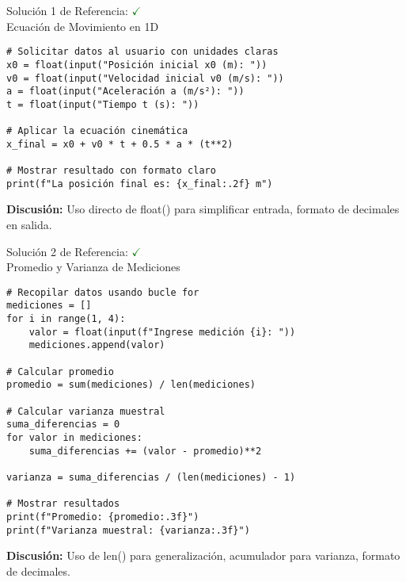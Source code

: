 \documentclass[10pt]{beamer}
\begin{document}
\begin{frame}[fragile]{Solución 1 de Referencia: \hfill \textcolor{green}{$\checkmark$} \\ Ecuación de Movimiento en 1D}
\begin{verbatim}
# Solicitar datos al usuario con unidades claras
x0 = float(input("Posición inicial x0 (m): "))
v0 = float(input("Velocidad inicial v0 (m/s): "))
a = float(input("Aceleración a (m/s²): "))
t = float(input("Tiempo t (s): "))

# Aplicar la ecuación cinemática
x_final = x0 + v0 * t + 0.5 * a * (t**2)

# Mostrar resultado con formato claro
print(f"La posición final es: {x_final:.2f} m")
\end{verbatim}
\textbf{Discusión:} Uso directo de float() para simplificar entrada, formato de decimales en salida.
\end{frame}

\begin{frame}[fragile]{Solución 2 de Referencia: \hfill \textcolor{green}{$\checkmark$} \\ Promedio y Varianza de Mediciones}
\begin{verbatim}
# Recopilar datos usando bucle for
mediciones = []
for i in range(1, 4):
    valor = float(input(f"Ingrese medición {i}: "))
    mediciones.append(valor)

# Calcular promedio
promedio = sum(mediciones) / len(mediciones)

# Calcular varianza muestral
suma_diferencias = 0
for valor in mediciones:
    suma_diferencias += (valor - promedio)**2

varianza = suma_diferencias / (len(mediciones) - 1)

# Mostrar resultados
print(f"Promedio: {promedio:.3f}")
print(f"Varianza muestral: {varianza:.3f}")
\end{verbatim}
\textbf{Discusión:} Uso de len() para generalización, acumulador para varianza, formato de decimales.
\end{frame}
\end{document}
